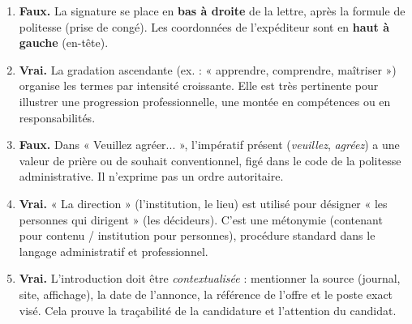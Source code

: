 \documentclass[11pt]{article}
\newcommand{\cle}[1]{{\popxbold\color{popdark}#1}}
\begin{document}
\begin{corrige}
\begin{enumerate}
    \item \textbf{Faux.} La signature se place en \textbf{bas à droite} de la lettre, après la formule de politesse (prise de congé). Les coordonnées de l'expéditeur sont en \textbf{haut à gauche} (en-tête).
    \item \textbf{Vrai.} La \cle{gradation ascendante} (ex. : « apprendre, comprendre, maîtriser ») organise les termes par intensité croissante. Elle est très pertinente pour illustrer une progression professionnelle, une montée en compétences ou en responsabilités.
    \item \textbf{Faux.} Dans « Veuillez agréer... », l'impératif présent (\emph{veuillez}, \emph{agréez}) a une valeur de \cle{prière} ou de \cle{souhait} conventionnel, figé dans le code de la politesse administrative. Il n'exprime pas un ordre autoritaire.
    \item \textbf{Vrai.} « La direction » (l'institution, le lieu) est utilisé pour désigner « les personnes qui dirigent » (les décideurs). C'est une \cle{métonymie} (contenant pour contenu / institution pour personnes), procédure standard dans le langage administratif et professionnel.
    \item \textbf{Vrai.} L'introduction doit être \emph{contextualisée} : mentionner la source (journal, site, affichage), la date de l'annonce, la référence de l'offre et le poste exact visé. Cela prouve la traçabilité de la candidature et l'attention du candidat.
\end{enumerate}
\end{corrige}
\end{document}
